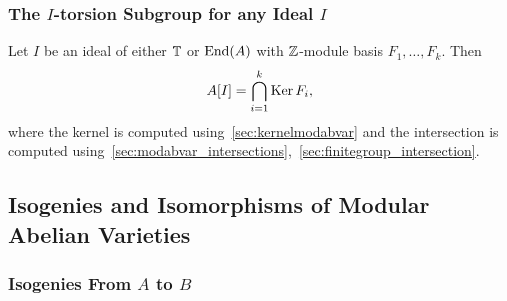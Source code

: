 \documentclass{article}
\begin{document}

\subsubsection{The $I$-torsion Subgroup for any Ideal $I$}

Let $I$ be an ideal of either $\mathbb{T}$ or $\operatorname{End}(A)$ with $\mathbb{Z}$-module basis
$F_1,\ldots,F_k$. Then
\[
    A[I] = \bigcap_{i=1} ^k \operatorname{Ker} F_i,
\]
where the kernel is computed using~\ref{sec:kernelmodabvar} and the
intersection is computed
using~\ref{sec:modabvar_intersections},~\ref{sec:finitegroup_intersection}.

\subsection{Isogenies and Isomorphisms of Modular Abelian Varieties}

\subsubsection{Isogenies From $A$ to $B$}
\end{document}
